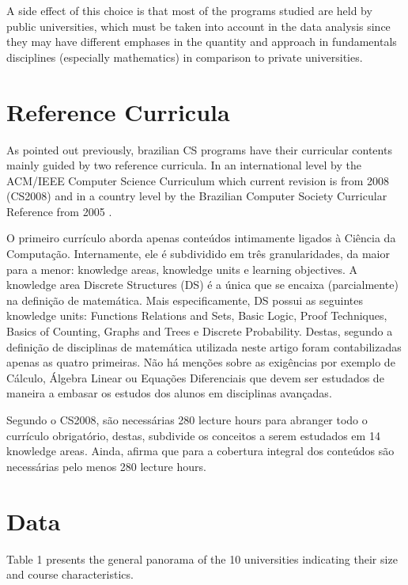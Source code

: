 \documentclass[conference]{IEEEtran}
\begin{document}
	A side effect of this choice is that most of the programs studied are held by public universities, which must be taken into account in the data analysis since they may have different emphases in the quantity and approach in fundamentals disciplines (especially mathematics) in comparison to private universities.

\section{Reference Curricula}
	As pointed out previously, brazilian CS programs have their curricular contents mainly guided by two reference curricula. In an international level by the ACM/IEEE Computer Science Curriculum which current revision is from 2008 (CS2008) \cite{cs2008} and in a country level by the Brazilian Computer Society Curricular Reference from 2005 \cite{sbc}.
	
	O primeiro currículo aborda apenas conteúdos intimamente ligados à Ciência da Computação. Internamente, ele é subdividido em três granularidades, da maior para a menor: knowledge areas, knowledge units e learning objectives. A knowledge area Discrete Structures (DS) é a única que se encaixa (parcialmente) na definição de matemática. Mais especificamente, DS possui as seguintes knowledge units: Functions Relations and Sets, Basic Logic, Proof Techniques, Basics of Counting, Graphs and Trees e Discrete Probability. Destas, segundo a definição de disciplinas de matemática utilizada neste artigo foram contabilizadas apenas as quatro primeiras. Não há menções sobre as exigências por exemplo de Cálculo, Álgebra Linear ou Equações Diferenciais que devem ser estudados de maneira a embasar os estudos dos alunos em disciplinas avançadas.
	
	Segundo o CS2008, são necessárias 280 lecture hours para abranger todo o currículo obrigatório, destas, 
	subdivide os conceitos a serem estudados em 14 knowledge areas. Ainda, afirma que para a cobertura integral dos conteúdos são necessárias pelo menos 280 lecture hours. 

\section{Data}
Table 1 presents the general panorama of the 10 universities indicating their size and course characteristics.
\end{document}
